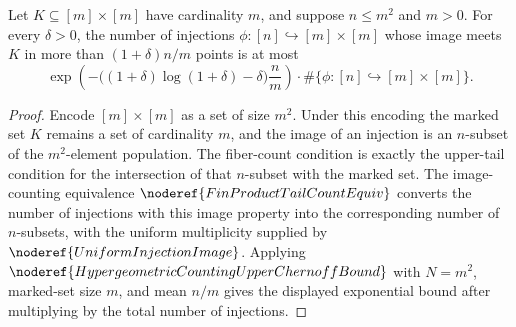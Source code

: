 \begin{helper}
Let \(K\subseteq [m]\times [m]\) have cardinality \(m\), and suppose
\(n\le m^2\) and \(m>0\).  For every \(\delta>0\), the number of injections
\(\phi:[n]\hookrightarrow [m]\times[m]\) whose image meets \(K\) in more than
\((1+\delta)n/m\) points is at most
\[
  \exp\!\left(-\bigl((1+\delta)\log(1+\delta)-\delta\bigr)\frac{n}{m}\right)
  \cdot \#\{\phi:[n]\hookrightarrow [m]\times[m]\}.
\]
\end{helper}
\begin{proof}
Encode \([m]\times[m]\) as a set of size \(m^2\).  Under this encoding the
marked set \(K\) remains a set of cardinality \(m\), and the image of an
injection is an \(n\)-subset of the \(m^2\)-element population.  The fiber-count
condition is exactly the upper-tail condition for the intersection of that
\(n\)-subset with the marked set.  The image-counting equivalence
\(\noderef{FinProductTailCountEquiv}\) converts the number of injections with
this image property into the corresponding number of \(n\)-subsets, with the
uniform multiplicity supplied by \(\noderef{UniformInjectionImage}\).  Applying
\(\noderef{HypergeometricCountingUpperChernoffBound}\) with
\(N=m^2\), marked-set size \(m\), and mean \(n/m\) gives the displayed
exponential bound after multiplying by the total number of injections.
\end{proof}
